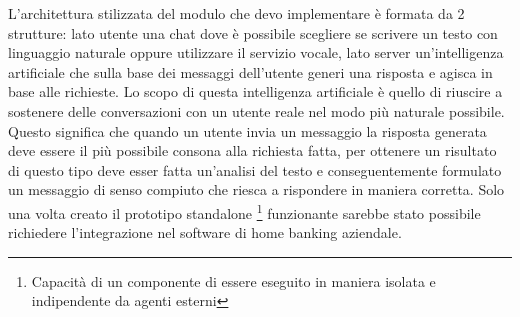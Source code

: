 L'architettura stilizzata del modulo che devo implementare è formata da 2 strutture: lato utente una chat dove è possibile scegliere se scrivere un testo con linguaggio naturale oppure utilizzare il servizio vocale, lato server un'intelligenza artificiale che sulla base dei messaggi dell'utente generi una risposta e agisca in base alle richieste.
Lo scopo di questa intelligenza artificiale è quello di riuscire a sostenere delle conversazioni con un utente reale nel modo più naturale possibile. Questo significa che quando un utente invia un messaggio la risposta generata deve essere il più possibile consona alla richiesta fatta, per ottenere un risultato di questo tipo deve esser fatta un'analisi del testo e conseguentemente formulato un messaggio di senso compiuto che riesca a rispondere in maniera corretta.
Solo una volta creato il prototipo standalone \footnote{Capacità di un componente di essere eseguito in maniera isolata e indipendente da agenti esterni} funzionante sarebbe stato possibile richiedere l'integrazione nel software di home banking aziendale.
